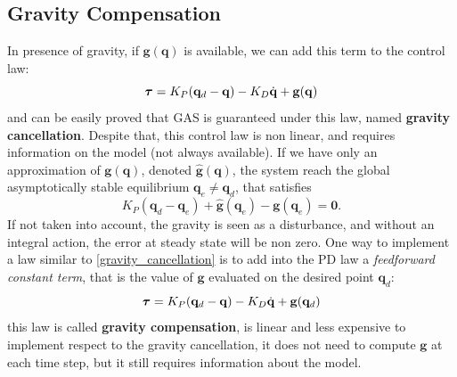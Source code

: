 \documentclass[10pt, a4paper]{report}
\newcommand{\q}{{\mathbf q}}
\begin{document}
\subsection{Gravity Compensation}
In presence of gravity, if $\mathbf g(\q)$ is available, we can add this term to the control law:\begin{equation}\label{gravity_cancellation}
    \btau=K_P(\q_d-\q)-K_D\dq+\mathbf g(\q)
\end{equation}
and can be easily proved that GAS is guaranteed under this law, named \textbf{gravity cancellation}. Despite that, this control law is non linear, and requires information on the model (not always available). If we have only an approximation of $\mathbf g(\q)$, denoted $\hat{\mathbf g}(\q)$, the system reach the global asymptotically stable equilibrium $\q_e\ne \q_d$, that satisfies\begin{equation}
    K_P(\q_d-\q_e)+\hat{\mathbf g}(\q_e)-\mathbf g(\q_e)=\mathbf 0.
\end{equation}
If not taken into account, the gravity is seen as a disturbance, and without an integral action, the error at steady state will be non zero. One way to implement a law similar to \eqref{gravity_cancellation} is to add into the PD law a \textit{feedforward constant term}, that is the value of $\mathbf g$ evaluated on the desired point $\q_d$:\begin{equation}\label{gravity_compensation}
     \btau=K_P(\q_d-\q)-K_D\dq+\mathbf g(\q_d)
\end{equation}
this law is called \textbf{gravity compensation}, is linear and less expensive to implement respect to the gravity cancellation, it does not need to compute $\mathbf g$ at each time step, but it still requires information about the model.\bigskip
\end{document}
